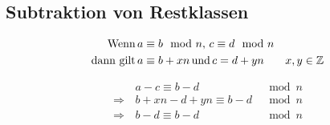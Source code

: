 \documentclass{article}
\begin{document}
\subsection{Subtraktion von Restklassen}

\begin{align*}
	\textnormal{Wenn}\,     & a \equiv b \mod n,\,c \equiv d \mod n\\
	\textnormal{dann gilt}\,& a \equiv b + xn\,\textnormal{und}\,c = d + yn & x,y \in \mathbb{Z}
\end{align*}

\begin{align*}
				 & a - c \equiv b - d           & \mod n\\
	\Rightarrow\,& b + xn - d + yn \equiv b - d & \mod n\\
	\Rightarrow\,& b - d \equiv b - d           & \mod n\\
\end{align*}
\end{document}
